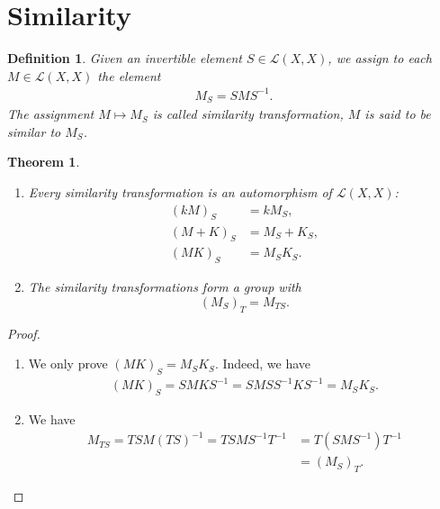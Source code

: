 \documentclass[11pt]{book}
\newtheorem{definition}{Definition}[chapter]
\newtheorem{theorem}{Theorem}[chapter]
\theoremstyle{definition}
\numberwithin{equation}{chapter}
\begin{document}
\medskip

\section{Similarity}
\begin{definition}\label{similarity}
Given an invertible element $S\in \mathscr{L}(X, X)$, we assign to each $M\in \mathscr{L}(X,X)$ the element
\begin{align*}
    M_S = SMS^{-1}.
\end{align*}
The assignment $M\mapsto M_S$ is called similarity transformation, $M$ is said to be similar to $M_S$.
\end{definition}

\medskip

\begin{theorem}
~\begin{enumerate}[label=(\alph*)]
    \item Every similarity transformation is an automorphism of $\mathscr{L}(X,X)$:
    \begin{align*}
        (kM)_S & = kM_S,\\
        (M+K)_S & = M_S + K_S,\\
        (MK)_S & = M_S K_S.
    \end{align*}
    \item The similarity transformations form a group with $$(M_S)_T = M_{TS}.$$
\end{enumerate}
\end{theorem}
\begin{proof}
~\begin{enumerate}[label=(\alph*)]
    \item We only prove $(MK)_S = M_S K_S$. Indeed, we have 
    \begin{align*}
        (MK)_S = S M K S^{-1} = S M S S^{-1} K S^{-1} = M_S K_S.
    \end{align*}
    \item We have 
    \begin{align*}
        M_{TS} = TS M (TS)^{-1} = TS M S^{-1} T^{-1} & = T(S M S^{-1}) T^{-1} \\
        & = (M_S)_T.
    \end{align*}
\end{enumerate}
\end{proof}

\medskip
\end{document}

